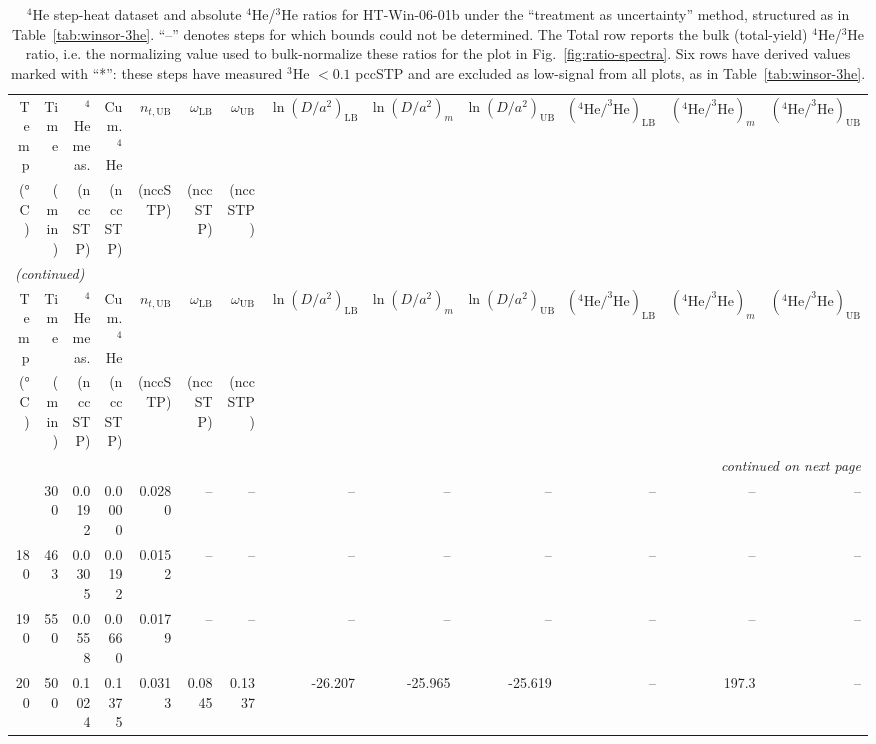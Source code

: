 \begin{landscape}
\begin{footnotesize}
\begin{longtable}{r r r r r r r r r r r r r}
\caption{$^4$He step-heat dataset and absolute $^4$He/$^3$He ratios for HT-Win-06-01b under the ``treatment as uncertainty'' method, structured as in Table~\ref{tab:winsor-3he}. ``--'' denotes steps for which bounds could not be determined. The Total row reports the bulk (total-yield) $^4$He/$^3$He ratio, i.e. the normalizing value used to bulk-normalize these ratios for the plot in Fig.~\ref{fig:ratio-spectra}. Six rows have derived values marked with ``*'': these steps have measured $^3$He $<0.1$ pccSTP and are excluded as low-signal from all plots, as in Table~\ref{tab:winsor-3he}.}\label{tab:winsor-4he}\\
\toprule
Temp & Time & $^4$He meas. & Cum. $^4$He & $n_{t,\mathrm{UB}}$ & $\omega_{\mathrm{LB}}$ & $\omega_{\mathrm{UB}}$ & $\ln(D/a^2)_{\mathrm{LB}}$ & $\ln(D/a^2)_{m}$ & $\ln(D/a^2)_{\mathrm{UB}}$ & $(^4\mathrm{He}/^3\mathrm{He})_{\mathrm{LB}}$ & $(^4\mathrm{He}/^3\mathrm{He})_{m}$ & $(^4\mathrm{He}/^3\mathrm{He})_{\mathrm{UB}}$ \\
(°C) & (min) & (nccSTP) & (nccSTP) & (nccSTP) & (nccSTP) & (nccSTP) &  &  &  &  &  &  \\
\midrule
\endfirsthead
\multicolumn{13}{l}{\textit{(continued)}} \\
\toprule
Temp & Time & $^4$He meas. & Cum. $^4$He & $n_{t,\mathrm{UB}}$ & $\omega_{\mathrm{LB}}$ & $\omega_{\mathrm{UB}}$ & $\ln(D/a^2)_{\mathrm{LB}}$ & $\ln(D/a^2)_{m}$ & $\ln(D/a^2)_{\mathrm{UB}}$ & $(^4\mathrm{He}/^3\mathrm{He})_{\mathrm{LB}}$ & $(^4\mathrm{He}/^3\mathrm{He})_{m}$ & $(^4\mathrm{He}/^3\mathrm{He})_{\mathrm{UB}}$ \\
(°C) & (min) & (nccSTP) & (nccSTP) & (nccSTP) & (nccSTP) & (nccSTP) &  &  &  &  &  &  \\
\midrule
\endhead
\midrule
\multicolumn{13}{r}{\textit{continued on next page}} \\
\endfoot
\bottomrule
\endlastfoot
170 & 300 & 0.0192 & 0.0000 & 0.0280 & -- & -- & -- & -- & -- & -- & -- & -- \\
180 & 463 & 0.0305 & 0.0192 & 0.0152 & -- & -- & -- & -- & -- & -- & -- & -- \\
190 & 550 & 0.0558 & 0.0660 & 0.0179 & -- & -- & -- & -- & -- & -- & -- & -- \\
200 & 500 & 0.1024 & 0.1375 & 0.0313 & 0.0845 & 0.1337 & -26.207 & -25.965 & -25.619 & -- & 197.3 & -- \\

\end{longtable}
\end{footnotesize}
\end{landscape}
